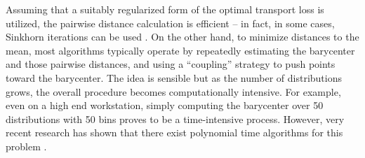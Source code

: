 Assuming that a suitably regularized form of the optimal transport loss is utilized, the pairwise distance 
calculation is efficient -- in fact, 
in some cases, Sinkhorn iterations can be used \citep{cuturi2013sinkhorn}. 
On the other hand, to minimize distances to the mean, 
most algorithms typically operate 
by repeatedly estimating the barycenter and those pairwise distances, and using a ``coupling'' strategy 
to push points toward the barycenter. 
The idea is sensible but as the number of distributions 
grows, the overall procedure becomes 
computationally intensive.
For example, even on a high end workstation, 
simply computing the barycenter over
50 distributions with 50 bins
proves to be a time-intensive process.
However, very recent research has shown that there exist polynomial time algorithms for this problem 
\citep{altschuler2021wasserstein}. 


